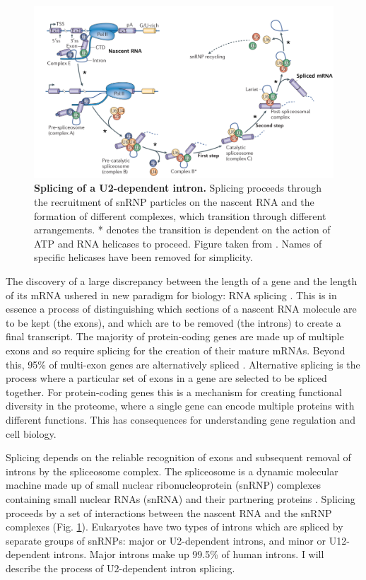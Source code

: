 \begin{figure}[h!]
	\centering
	\includegraphics[width=\textwidth]{Figures/01_introduction/splicing.png}
	\caption[Splicing of a U2-dependent intron]{
		\textbf{Splicing of a U2-dependent intron.}
		Splicing proceeds through the recruitment of snRNP particles on the nascent RNA and the formation of different complexes, which transition through different arrangements. 
		* denotes the transition is dependent on the action of ATP and RNA helicases to proceed.
		Figure taken from \citep{Matera2014}. Names of specific helicases have been removed for simplicity.
	 }
	\label{fig:intro_splicing}
\end{figure}

The discovery of a large discrepancy between the length of a gene and the length of its mRNA ushered in new paradigm for biology: RNA splicing \citep{Berget1977,Chow1977}.
This is in essence a process of distinguishing which sections of a nascent RNA molecule are to be kept (the exons), and which are to be removed (the introns) to create a final transcript.
The majority of protein-coding genes are made up of multiple exons and so require splicing for the creation of their mature mRNAs. 
Beyond this, 95\% of multi-exon genes are alternatively spliced \citep{Pan2008,Wang2008}. 
Alternative splicing is the process where a particular set of exons in a gene are selected to be spliced together.
For protein-coding genes this is a mechanism for creating functional diversity in the proteome, where a single gene can encode multiple proteins with different functions.
This has consequences for understanding gene regulation and cell biology.

Splicing depends on the reliable recognition of exons and subsequent removal of introns by the spliceosome complex. 
The spliceosome is a dynamic molecular machine made up of small nuclear ribonucleoprotein (snRNP) complexes containing small nuclear RNAs (snRNA) and their partnering proteins \citep{Matera2014}. 
Splicing proceeds by a set of interactions between the nascent RNA and the snRNP complexes (Fig. \ref{fig:intro_splicing}).
Eukaryotes have two types of introns which are spliced by separate groups of snRNPs: major or U2-dependent introns, and minor or U12-dependent introns. 
Major introns make up 99.5\% of human introns. I will describe the process of U2-dependent intron splicing.

